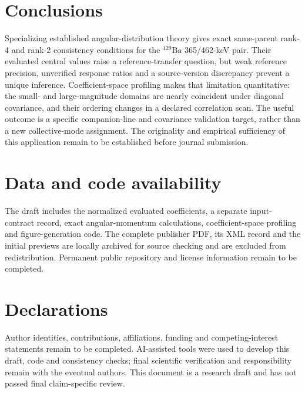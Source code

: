 \documentclass[pdflatex,iicol,sn-mathphys-num]{sn-jnl}
\begin{document}
\section{Conclusions}

Specializing established angular-distribution theory gives exact same-parent rank-4 and rank-2 consistency conditions for the \(^{129}\mathrm{Ba}\) 365/462-keV pair. Their evaluated central values raise a reference-transfer question, but weak reference precision, unverified response ratios and a source-version discrepancy prevent a unique inference. Coefficient-space profiling makes that limitation quantitative: the small- and large-magnitude domains are nearly coincident under diagonal covariance, and their ordering changes in a declared correlation scan. The useful outcome is a specific companion-line and covariance validation target, rather than a new collective-mode assignment. The originality and empirical sufficiency of this application remain to be established before journal submission.

\section*{Data and code availability}
The draft includes the normalized evaluated coefficients, a separate input-contract record, exact angular-momentum calculations, coefficient-space profiling and figure-generation code. The complete publisher PDF, its XML record and the initial previews are locally archived for source checking and are excluded from redistribution. Permanent public repository and license information remain to be completed.

\section*{Declarations}
Author identities, contributions, affiliations, funding and competing-interest statements remain to be completed. AI-assisted tools were used to develop this draft, code and consistency checks; final scientific verification and responsibility remain with the eventual authors. This document is a research draft and has not passed final claim-specific review.

\end{document}
